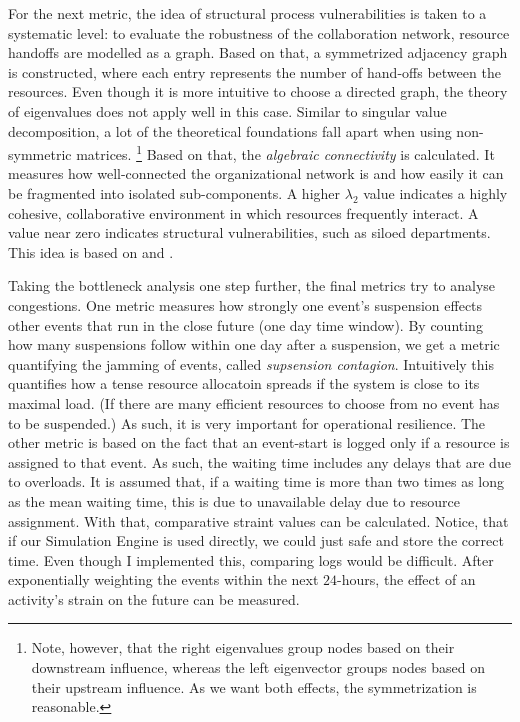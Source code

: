 For the next metric, the idea of structural process vulnerabilities is taken to a systematic level: to evaluate the robustness of the collaboration network, resource handoffs are modelled as a graph. Based on that, a symmetrized adjacency graph is constructed, where each entry represents the number of hand-offs between the resources. Even though it is more intuitive to choose a directed graph, the theory of eigenvalues does not apply well in this case. Similar to singular value decomposition, a lot of the theoretical foundations fall apart when using non-symmetric matrices. \footnote{Note, however, that the right eigenvalues group nodes based on their downstream influence, whereas the left eigenvector groups nodes based on their upstream influence. As we want both effects, the symmetrization is reasonable.}
Based on that, the \emph{algebraic connectivity} is calculated. It measures how well-connected the organizational network is and how easily it can be fragmented into isolated sub-components. A higher $\lambda_2$ value indicates a highly cohesive, collaborative environment in which resources frequently interact. A value near zero indicates structural vulnerabilities, such as siloed departments. This idea is based on \cite{Fiedler1973} and \cite{Zheng2022}.

Taking the bottleneck analysis one step further, the final metrics try to analyse congestions. One metric measures how strongly one event's suspension effects other events that run in the close future (one day time window). By counting how many suspensions follow within one day after a suspension, we get a metric quantifying the jamming of events, called \emph{supsension contagion}. Intuitively this quantifies how a tense resource allocatoin spreads if the system is close to its maximal load. (If there are many efficient resources to choose from no event has to be suspended.) As such, it is very important for operational resilience.
The other metric is based on the fact that an event-start is logged only if a resource is assigned to that event. As such, the waiting time includes any delays that are due to overloads. It is assumed that, if a waiting time is more than two times as long as the mean waiting time, this is due to unavailable delay due to resource assignment. With that, comparative straint values can be calculated. Notice, that if our Simulation Engine is used directly, we could just safe and store the correct time. Even though I implemented this, comparing logs would be difficult. After exponentially weighting the events within the next $24$-hours, the effect of an activity's strain on the future can be measured.


